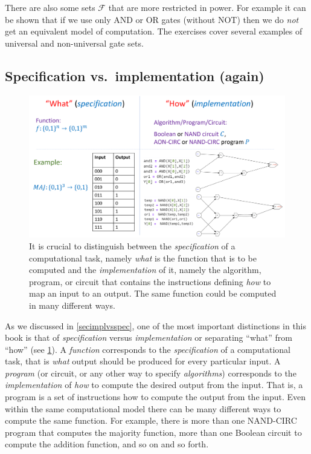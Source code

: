 There are also some sets \(\mathcal{F}\) that are more restricted in
power. For example it can be shown that if we use only AND or OR gates
(without NOT) then we do \emph{not} get an equivalent model of
computation. The exercises cover several examples of universal and
non-universal gate sets.

\subsection{Specification vs.~implementation
(again)}\label{specvsimplrem}


\begin{figure}
\centering
\includegraphics[width=\textwidth, height=0.25\paperheight, keepaspectratio]{../figure/specvsimpl.png}
\caption{It is crucial to distinguish between the \emph{specification}
of a computational task, namely \emph{what} is the function that is to
be computed and the \emph{implementation} of it, namely the algorithm,
program, or circuit that contains the instructions defining \emph{how}
to map an input to an output. The same function could be computed in
many different ways.}
\label{specvsimplfig}
\end{figure}

As we discussed in \cref{secimplvsspec}, one of the most important
distinctions in this book is that of \emph{specification} versus
\emph{implementation} or separating ``what'' from ``how'' (see
\cref{specvsimplfig}). A \emph{function} corresponds to the
\emph{specification} of a computational task, that is \emph{what} output
should be produced for every particular input. A \emph{program} (or
circuit, or any other way to specify \emph{algorithms}) corresponds to
the \emph{implementation} of \emph{how} to compute the desired output
from the input. That is, a program is a set of instructions how to
compute the output from the input. Even within the same computational
model there can be many different ways to compute the same function. For
example, there is more than one NAND-CIRC program that computes the
majority function, more than one Boolean circuit to compute the addition
function, and so on and so forth.

